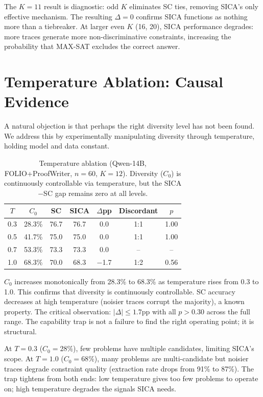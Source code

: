 \documentclass[11pt,a4paper]{article}
\begin{document}
The $K{=}11$ result is diagnostic: odd $K$ eliminates SC ties, removing SICA's only effective mechanism. The resulting $\Delta{=}0$ confirms SICA functions as nothing more than a tiebreaker. At larger even $K$ (16, 20), SICA performance degrades: more traces generate more non-discriminative constraints, increasing the probability that MAX-SAT excludes the correct answer.

\section{Temperature Ablation: Causal Evidence}
\label{sec:temperature}

A natural objection is that perhaps the right diversity level has not been found. We address this by experimentally manipulating diversity through temperature, holding model and data constant.

\begin{table}[t]
\centering
\small
\caption{Temperature ablation (Qwen-14B, FOLIO+ProofWriter, $n{=}60$, $K{=}12$). Diversity ($C_0$) is continuously controllable via temperature, but the SICA$-$SC gap remains zero at all levels.}
\label{tab:temperature}
\begin{tabular}{ccccccc}
\toprule
$T$ & $C_0$ & SC & SICA & $\Delta$pp & Discordant & $p$ \\
\midrule
0.3 & 28.3\% & 76.7 & 76.7 & 0.0 & 1:1 & 1.00 \\
0.5 & 41.7\% & 75.0 & 75.0 & 0.0 & 1:1 & 1.00 \\
0.7 & 53.3\% & 73.3 & 73.3 & 0.0 & -- & -- \\
1.0 & 68.3\% & 70.0 & 68.3 & $-$1.7 & 1:2 & 0.56 \\
\bottomrule
\end{tabular}
\end{table}

$C_0$ increases monotonically from 28.3\% to 68.3\% as temperature rises from 0.3 to 1.0. This confirms that diversity is continuously controllable. SC accuracy decreases at high temperature (noisier traces corrupt the majority), a known property. The critical observation: $|\Delta| \leq 1.7$pp with all $p > 0.30$ across the full range. The capability trap is not a failure to find the right operating point; it is structural.

At $T{=}0.3$ ($C_0{=}28\%$), few problems have multiple candidates, limiting SICA's scope. At $T{=}1.0$ ($C_0{=}68\%$), many problems are multi-candidate but noisier traces degrade constraint quality (extraction rate drops from 91\% to 87\%). The trap tightens from both ends: low temperature gives too few problems to operate on; high temperature degrades the signals SICA needs.
\end{document}
